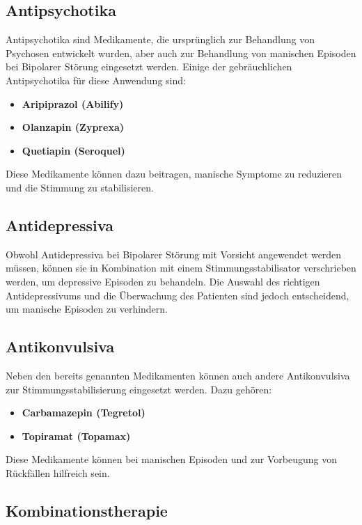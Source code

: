 \subsection{Antipsychotika}

Antipsychotika sind Medikamente, die ursprünglich zur Behandlung von Psychosen entwickelt wurden, aber auch zur Behandlung von manischen Episoden bei Bipolarer Störung eingesetzt werden. Einige der gebräuchlichen Antipsychotika für diese Anwendung sind:

\begin{itemize}
\item \textbf{Aripiprazol (Abilify)}
\item \textbf{Olanzapin (Zyprexa)}
\item \textbf{Quetiapin (Seroquel)}
\end{itemize}

Diese Medikamente können dazu beitragen, manische Symptome zu reduzieren und die Stimmung zu stabilisieren.

\subsection{Antidepressiva}

Obwohl Antidepressiva bei Bipolarer Störung mit Vorsicht angewendet werden müssen, können sie in Kombination mit einem Stimmungsstabilisator verschrieben werden, um depressive Episoden zu behandeln. Die Auswahl des richtigen Antidepressivums und die Überwachung des Patienten sind jedoch entscheidend, um manische Episoden zu verhindern.

\subsection{Antikonvulsiva}

Neben den bereits genannten Medikamenten können auch andere Antikonvulsiva zur Stimmungsstabilisierung eingesetzt werden. Dazu gehören:

\begin{itemize}
\item \textbf{Carbamazepin (Tegretol)}
\item \textbf{Topiramat (Topamax)}
\end{itemize}

Diese Medikamente können bei manischen Episoden und zur Vorbeugung von Rückfällen hilfreich sein.

\subsection{Kombinationstherapie}

